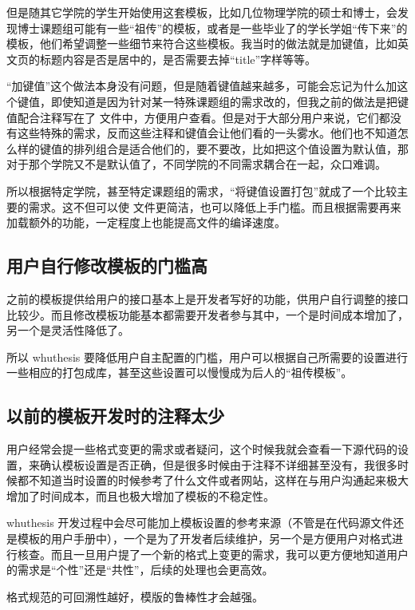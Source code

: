 但是随其它学院的学生开始使用这套模板，比如几位物理学院的硕士和博士，会发现博士课题组可能有一些“祖传”的模板，或者是一些毕业了的学长学姐“传下来”的模板，他们希望调整一些细节来符合这些模板。我当时的做法就是加键值，比如英文页的标题内容是否是居中的，是否需要去掉“title”字样等等。

“加键值”这个做法本身没有问题，但是随着键值越来越多，可能会忘记为什么加这个键值，即使知道是因为针对某一特殊课题组的需求改的，但我之前的做法是把键值配合注释写在了  文件中，方便用户查看。但是对于大部分用户来说，它们都没有这些特殊的需求，反而这些注释和键值会让他们看的一头雾水。他们也不知道怎么样的键值的排列组合是适合他们的，要不要改，比如把这个值设置为默认值，那对于那个学院又不是默认值了，不同学院的不同需求耦合在一起，众口难调。

所以根据特定学院，甚至特定课题组的需求，“将键值设置打包”就成了一个比较主要的需求。这不但可以使  文件更简洁，也可以降低上手门槛。而且根据需要再来加载额外的功能，一定程度上也能提高文件的编译速度。



\subsection{用户自行修改模板的门槛高}

之前的模板提供给用户的接口基本上是开发者写好的功能，供用户自行调整的接口比较少。而且修改模板功能基本都需要开发者参与其中，一个是时间成本增加了，另一个是灵活性降低了。

所以 whuthesis 要降低用户自主配置的门槛，用户可以根据自己所需要的设置进行一些相应的打包成库，甚至这些设置可以慢慢成为后人的“祖传模板”。


\subsection{以前的模板开发时的注释太少}

用户经常会提一些格式变更的需求或者疑问，这个时候我就会查看一下源代码的设置，来确认模板设置是否正确，但是很多时候由于注释不详细甚至没有，我很多时候都不知道当时设置的时候参考了什么文件或者网站，这样在与用户沟通起来极大增加了时间成本，而且也极大增加了模板的不稳定性。

whuthesis 开发过程中会尽可能加上模板设置的参考来源（不管是在代码源文件还是模板的用户手册中），一个是为了开发者后续维护，另一个是方便用户对格式进行核查。而且一旦用户提了一个新的格式上变更的需求，我可以更方便地知道用户的需求是“个性”还是“共性”，后续的处理也会更高效。

格式规范的可回溯性越好，模版的鲁棒性才会越强。



